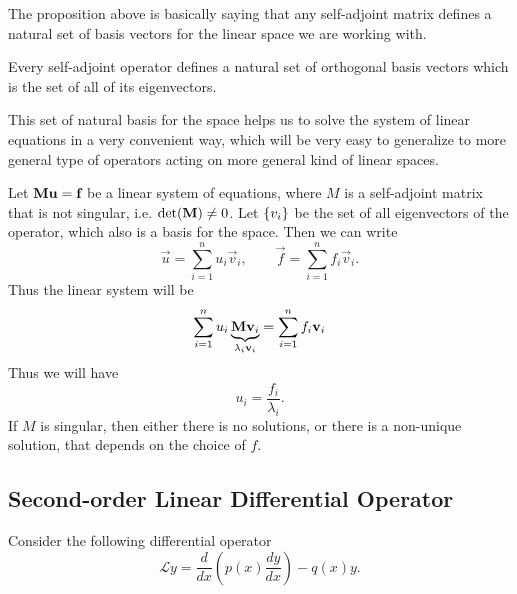 The proposition above is basically saying that any self-adjoint matrix defines a natural set of basis vectors for the linear space we are working with.
\begin{observation}
	Every self-adjoint operator defines a natural set of orthogonal basis vectors which is the set of all of its eigenvectors.
\end{observation}
This set of natural basis for the space helps us to solve the system of linear equations in a very convenient way, which will be very easy to generalize to more general type of operators acting on more general kind of linear spaces. 
\begin{observation}
	Let $\textbf{M}\textbf{u} = \textbf{f}$ be a linear system of equations, where $M$ is a self-adjoint matrix that is not singular, i.e. $\det(\textbf{M}) \neq 0$. Let $\{v_i\}$ be the set of all eigenvectors of the operator, which also is a basis for the space. Then we can write
	\[ \vec{u} = \sum_{i=1}^{n} u_i \vec{v}_i, \qquad \vec{f} =\sum_{i=1}^{n} f_i \vec{v}_i. \]
	Thus the linear system will be
	\[ \sum_{i=1}^{n}u_i \underbrace{\textbf{M}\textbf{v}_i}_{\lambda_i\textbf{v}_i} =\sum_{i=1}^{n} f_i \textbf{v}_i  \]
	Thus we will have
	\[ u_i = \frac{f_i}{\lambda_i}. \]
	If $M$ is singular, then either there is no solutions, or there is a non-unique solution, that depends on the choice of $f$.
\end{observation}

\subsection{Second-order Linear Differential Operator}
Consider the following differential operator
\[  \mathcal{L} y = \frac{d}{dx}(p(x)\frac{dy}{dx}) - q(x)y. \]

